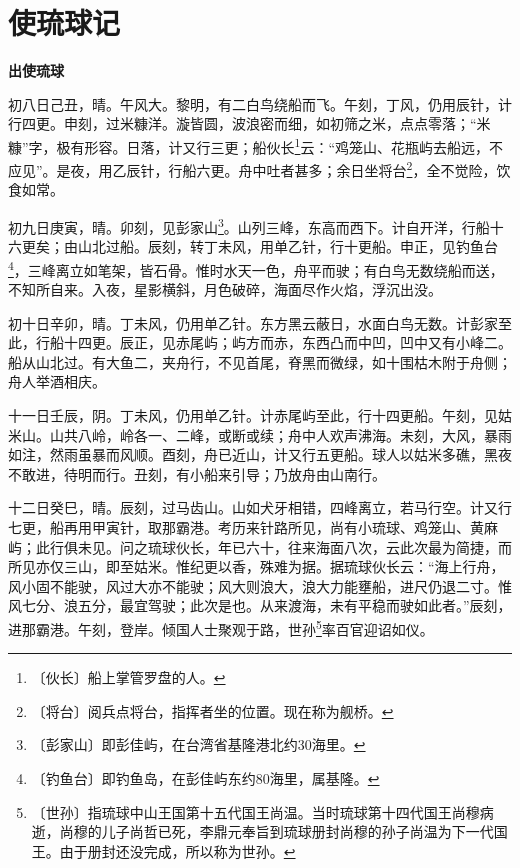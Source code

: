 \documentclass[12pt,UTF-8,openany,a4]{ctexbook}
\begin{document}
\chapter{使琉球记}

\begin{large}
    
    \begin{center}{\Large\textbf{出使琉球}}\end{center}
    
    初八日己丑，晴。午风大。黎明，有二白鸟绕船而飞。午刻，丁风，仍用辰针，计行四更。申刻，过米糠洋。漩皆圆，波浪密而细，如初筛之米，点点零落；“米糠”字，极有形容。日落，计又行三更；船伙长\footnote{〔伙长〕\yiwen 船上掌管罗盘的人。}云：“鸡笼山、花瓶屿去船远，不应见”。是夜，用乙辰针，行船六更。舟中吐者甚多；余日坐将台\footnote{〔将台〕\yiwen 阅兵点将台，指挥者坐的位置。现在称为舰桥。}，全不觉险，饮食如常。
    
    初九日庚寅，晴。卯刻，见彭家山\footnote{〔彭家山〕\yiwen 即彭佳屿，在台湾省基隆港北约30海里。}。山列三峰，东高而西下。计自开洋，行船十六更矣；由山北过船。辰刻，转丁未风，用单乙针，行十更船。申正，见钓鱼台\footnote{〔钓鱼台〕\yiwen 即钓鱼岛，在彭佳屿东约80海里，属基隆。}，三峰离立如笔架，皆石骨。惟时水天一色，舟平而驶；有白鸟无数绕船而送，不知所自来。入夜，星影横斜，月色破碎，海面尽作火焰，浮沉出没。
    
    初十日辛卯，晴。丁未风，仍用单乙针。东方黑云蔽日，水面白鸟无数。计彭家至此，行船十四更。辰正，见赤尾屿；屿方而赤，东西凸而中凹，凹中又有小峰二。船从山北过。有大鱼二，夹舟行，不见首尾，脊黑而微绿，如十围枯木附于舟侧；舟人举酒相庆。
    
    十一日壬辰，阴。丁未风，仍用单乙针。计赤尾屿至此，行十四更船。午刻，见姑米山。山共八岭，岭各一、二峰，或断或续；舟中人欢声沸海。未刻，大风，暴雨如注，然雨虽暴而风顺。酉刻，舟已近山，计又行五更船。球人以姑米多礁，黑夜不敢进，待明而行。丑刻，有小船来引导；乃放舟由山南行。
    
    十二日癸巳，晴。辰刻，过马齿山。山如犬牙相错，四峰离立，若马行空。计又行七更，船再用甲寅针，取那霸港。考历来针路所见，尚有小琉球、鸡笼山、黄麻屿；此行俱未见。问之琉球伙长，年已六十，往来海面八次，云此次最为简捷，而所见亦仅三山，即至姑米。惟纪更以香，殊难为据。据琉球伙长云：“海上行舟，风小固不能驶，风过大亦不能驶；风大则浪大，浪大力能壅船，进尺仍退二寸。惟风七分、浪五分，最宜驾驶；此次是也。从来渡海，未有平稳而驶如此者。”辰刻，进那霸港。午刻，登岸。倾国人士聚观于路，世孙\footnote{〔世孙〕\yiwen 指琉球中山王国第十五代国王尚温。当时琉球第十四代国王尚穆病逝，尚穆的儿子尚哲已死，李鼎元奉旨到琉球册封尚穆的孙子尚温为下一代国王。由于册封还没完成，所以称为世孙。}率百官迎诏如仪。
    

\end{large}
\end{document}
